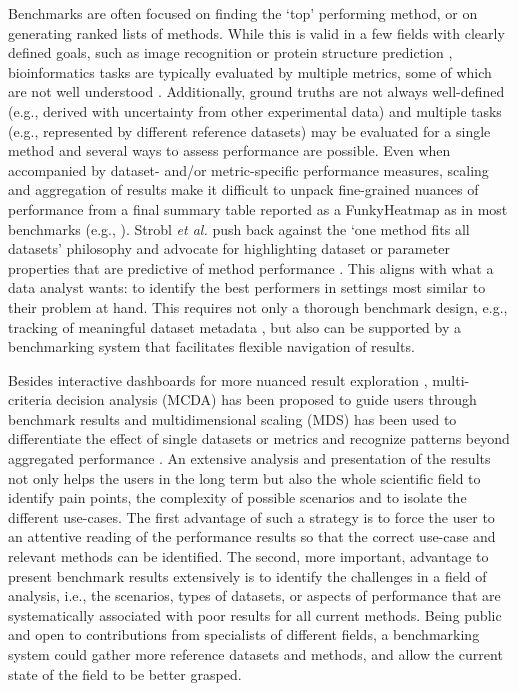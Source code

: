 \documentclass[11pt]{article}
\begin{document}
Benchmarks are often focused on finding the `top' performing method, or on generating ranked lists of methods. While this is valid in a few fields with clearly defined goals, such as image recognition \cite{Khan2018-ot} or protein structure prediction \cite{Jumper2021-oq}, bioinformatics tasks are typically evaluated by multiple metrics, some of which are not well understood \cite{Lutge2021-mt, Reinke2024-dw}. Additionally, ground truths are not always well-defined (e.g., derived with uncertainty from other experimental data) and multiple tasks (e.g., represented by different reference datasets) may be evaluated for a single method and several ways to assess performance are possible. Even when accompanied by dataset- and/or metric-specific performance measures, scaling and aggregation of results make it difficult to unpack fine-grained nuances of performance from a final summary table reported as a FunkyHeatmap \cite{funkyheatmap} as in most benchmarks (e.g., \cite{Saelens2019-jy}). Strobl \textit{et al.} push back against the `one method fits all datasets’ philosophy and advocate for highlighting dataset or parameter properties that are predictive of method performance \cite{Jelizarow2010-kr, Boulesteix2010-zj, Strobl2024-lp}. This aligns with what a data analyst wants: to identify the best performers in settings most similar to their problem at hand. This requires not only a thorough benchmark design, e.g., tracking of meaningful dataset metadata \cite{Strobl2024-lp}, but also can be supported by a benchmarking system that facilitates flexible navigation of results. 

Besides interactive dashboards for more nuanced result exploration \cite{bettr}, multi-criteria decision analysis (MCDA) \cite{Taherdoost2023-wd} has been proposed to guide users through benchmark results and multidimensional scaling (MDS) has been used to differentiate the effect of single datasets or metrics and recognize patterns beyond aggregated performance \cite{Niessl2022-fk}. An extensive analysis and presentation of the results not only helps the users in the long term but also the whole scientific field to identify pain points, the complexity of possible scenarios and to isolate the different use-cases. The first advantage of such a strategy is to force the user to an attentive reading of the performance results so that the correct use-case and relevant methods can be identified. The second, more important, advantage to present benchmark results extensively is to identify the challenges in a field of analysis, i.e., the scenarios, types of datasets, or aspects of performance that are systematically associated with poor results for all current methods. Being public and open to contributions from specialists of different fields, a benchmarking system could gather more reference datasets and methods, and allow the current state of the field to be better grasped. 
\end{document}

